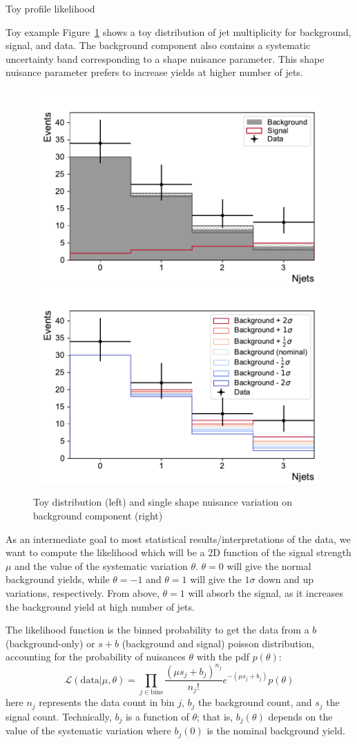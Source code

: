 \begin{section}{Toy profile likelihood}
\begin{subsection}{Toy example}
Figure~\ref{fig:toystat:njets} shows a toy distribution of jet multiplicity
for background, signal, and data. The background component also contains a
systematic uncertainty band corresponding to a shape nuisance parameter.
This shape nuisance parameter prefers to increase yields at higher number of jets.

\begin{figure}[!htb]
    \centering
    \includegraphics[width=0.48\linewidth]{figs/toy_statistics/njets.pdf}
    \includegraphics[width=0.48\linewidth]{figs/toy_statistics/backgroundvariations.pdf}
    \caption{
Toy distribution (left) and single shape nuisance variation on background component (right)
    }
    \label{fig:toystat:njets}
\end{figure}
    
As an intermediate goal to most statistical results/interpretations of the data,
we want to compute the likelihood which will be a 2D function of the
signal strength $\mu$ and the value of the systematic variation
$\theta$. $\theta=0$ will give the normal background yields, while
$\theta=-1$ and $\theta=1$ will give the $1\sigma$ down and up
variations, respectively. From above, $\theta=1$ will absorb
 the signal, as it increases the background yield at high number of
jets.

The likelihood function is the binned probability to get the data from a
$b$ (background-only) or $s+b$ (background and signal) poisson distribution, 
accounting for the probability of nuisances $\theta$ with the pdf $p(\theta)$:
\begin{equation}
\mathcal{L}(\mathrm{data}|\mu,\theta)=\prod_{j\in\mathrm{bins}}
\frac{(\mu s_j + b_j)^{n_j}}{n_j!}
e^{-(\mu s_j + b_j)}
p(\theta)
\end{equation}
 here $n_j$ represents the data count in bin $j$, $b_j$ the
background count, and $s_j$ the signal count. Technically, $b_j$ is
a function of $\theta$; that is, $b_j(\theta)$ depends on the value
of the systematic variation where $b_j(0)$ is the nominal background
yield.


\end{subsection}
\end{section}

